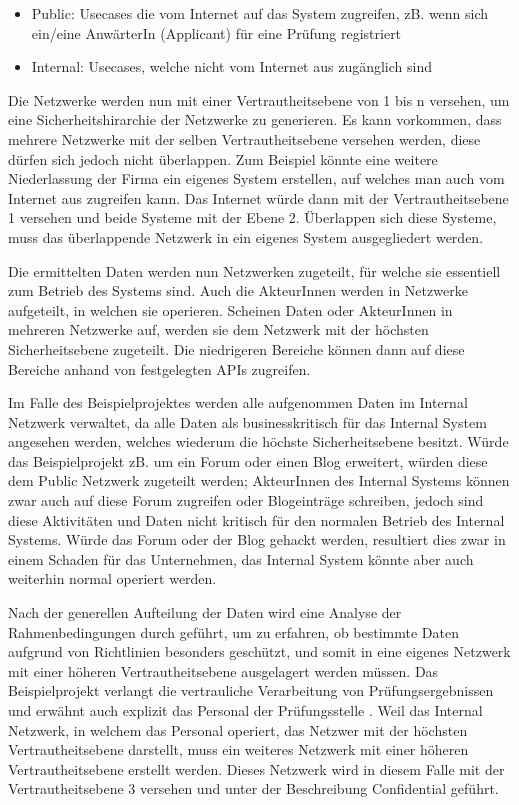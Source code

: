 \begin{itemize}
  \item Public: Usecases die vom Internet auf das System zugreifen, zB. wenn sich ein/eine AnwärterIn (Applicant) für eine Prüfung registriert
  \item Internal: Usecases, welche nicht vom Internet aus zugänglich sind
\end{itemize}

Die Netzwerke werden nun mit einer Vertrautheitsebene von 1 bis n versehen, um eine Sicherheitshirarchie der Netzwerke zu generieren. Es kann vorkommen, dass mehrere Netzwerke mit der selben Vertrautheitsebene versehen werden, diese dürfen sich jedoch nicht überlappen. Zum Beispiel könnte eine weitere Niederlassung der Firma ein eigenes System erstellen, auf welches man auch vom Internet aus zugreifen kann. Das Internet würde dann mit der Vertrautheitsebene 1 versehen und beide Systeme mit der Ebene 2. Überlappen sich diese Systeme, muss das überlappende Netzwerk in ein eigenes System ausgegliedert werden.

Die ermittelten Daten werden nun Netzwerken zugeteilt, für welche sie essentiell zum Betrieb des Systems sind. Auch die AkteurInnen werden in Netzwerke aufgeteilt, in welchen sie operieren. Scheinen Daten oder AkteurInnen in mehreren Netzwerke auf, werden sie dem Netzwerk mit der höchsten Sicherheitsebene zugeteilt. Die niedrigeren Bereiche können dann auf diese Bereiche anhand von festgelegten APIs zugreifen.

Im Falle des Beispielprojektes werden alle aufgenommen Daten im Internal Netzwerk verwaltet, da alle Daten als businesskritisch für das Internal System angesehen werden, welches wiederum die höchste Sicherheitsebene besitzt. Würde das Beispielprojekt zB. um ein Forum oder einen Blog erweitert, würden diese dem Public Netzwerk zugeteilt werden; AkteurInnen des Internal Systems können zwar auch auf diese Forum zugreifen oder Blogeinträge schreiben, jedoch sind diese Aktivitäten und Daten nicht kritisch für den normalen Betrieb des Internal Systems. Würde das Forum oder der Blog gehackt werden, resultiert dies zwar in einem Schaden für das Unternehmen, das Internal System könnte aber auch weiterhin normal operiert werden.

Nach der generellen Aufteilung der Daten wird eine Analyse der Rahmenbedingungen durch geführt, um zu erfahren, ob bestimmte Daten aufgrund von Richtlinien besonders geschützt, und somit in eine eigenes Netzwerk mit einer höheren Vertrautheitsebene ausgelagert werden müssen. Das Beispielprojekt verlangt die vertrauliche Verarbeitung von Prüfungsergebnissen und erwähnt auch explizit das Personal der Prüfungsstelle \cite[7.3]{ISO_CERT}. Weil das Internal Netzwerk, in welchem das Personal operiert, das Netzwer mit der höchsten Vertrautheitsebene darstellt, muss ein weiteres Netzwerk mit einer höheren Vertrautheitsebene erstellt werden. Dieses Netzwerk wird in diesem Falle mit der Vertrautheitsebene 3 versehen und unter der Beschreibung Confidential geführt.

